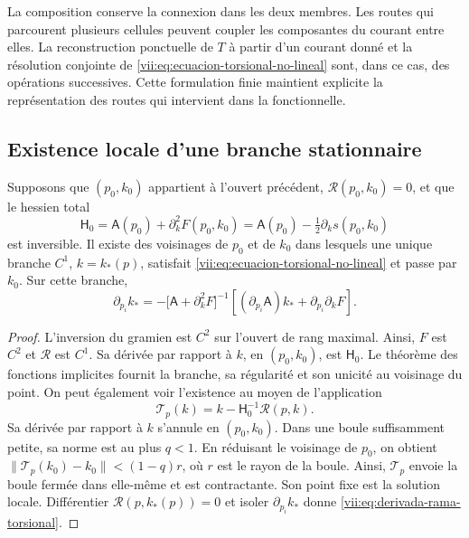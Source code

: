 La composition conserve la connexion dans les deux membres. Les routes
qui parcourent plusieurs cellules peuvent coupler les composantes du
courant entre elles. La reconstruction ponctuelle de \(T\) à partir
d'un courant donné et la résolution conjointe de
\eqref{vii:eq:ecuacion-torsional-no-lineal} sont, dans ce cas,
des opérations successives. Cette formulation finie maintient explicite
la représentation des routes qui intervient dans la fonctionnelle.

\subsection{Existence locale d'une branche stationnaire}
\label{vii:subsec:rama-torsional-local}

\begin{theorem}
\label{vii:thm:rama-torsional-local}
Supposons que \((p_0,k_0)\) appartient à l'ouvert précédent,
\(\mathcal R(p_0,k_0)=0\), et que le hessien total
\begin{equation}
 \mathsf H_0
 =\mathsf A(p_0)+\partial_k^2F(p_0,k_0)
 =\mathsf A(p_0)-\tfrac12\partial_ks(p_0,k_0)
 \label{vii:eq:hessiano-total-torsional}
\end{equation}
est inversible. Il existe des voisinages de \(p_0\) et de \(k_0\) dans lesquels
une unique branche \(C^1\), \(k=k_*(p)\), satisfait
\eqref{vii:eq:ecuacion-torsional-no-lineal} et passe par \(k_0\).
Sur cette branche,
\begin{equation}
 \partial_{p_i}k_*
 =-\bigl[\mathsf A+\partial_k^2F\bigr]^{-1}
     \left[(\partial_{p_i}\mathsf A)k_*
                      +\partial_{p_i}\partial_kF\right].
 \label{vii:eq:derivada-rama-torsional}
\end{equation}
\end{theorem}

\begin{proof}
L'inversion du gramien est \(C^2\) sur l'ouvert de rang maximal. Ainsi, \(F\) est \(C^2\) et \(\mathcal R\) est \(C^1\). Sa dérivée par rapport à \(k\), en \((p_0,k_0)\), est \(\mathsf H_0\). Le théorème des fonctions implicites fournit la branche, sa régularité et son unicité au voisinage du point. On peut également voir l'existence au moyen de l'application
\[
 \mathcal T_p(k)=k-\mathsf H_0^{-1}\mathcal R(p,k).
\]
Sa dérivée par rapport à \(k\) s'annule en \((p_0,k_0)\).
Dans une boule suffisamment petite, sa norme est au plus
\(q<1\). En réduisant le voisinage de \(p_0\), on obtient
\(\|\mathcal T_p(k_0)-k_0\|<(1-q)r\), où \(r\) est le
rayon de la boule. Ainsi, \(\mathcal T_p\) envoie la boule fermée
dans elle-même et est contractante. Son point fixe est la solution locale.
Différentier \(\mathcal R(p,k_*(p))=0\) et isoler
\(\partial_{p_i}k_*\) donne
\eqref{vii:eq:derivada-rama-torsional}.
\end{proof}

